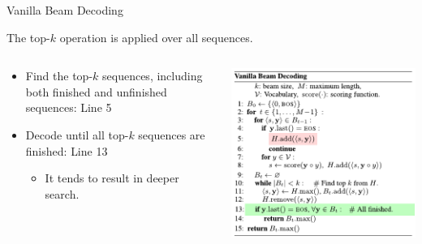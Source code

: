 \documentclass[t, unicode, 12pt, xdvipdfmx, aspectratio=169, bxjsarticle]{beamer}
\begin{document}
\begin{frame}[label={sec:org98134dc}]{Vanilla Beam Decoding}
\vspace{-0.2cm}
\begin{block}{The top-$k$ operation is applied over all sequences.}
\begin{columns}
\begin{column}{0.5\columnwidth}
\begin{itemize}
\item Find the top-\(k\) sequences, including both finished and unfinished sequences: \colorbox{red!15}{Line 5}
\item Decode until all top-\(k\) sequences are finished: \colorbox{green!25}{Line 13}
\begin{itemize}
\item It tends to result in deeper search.
\end{itemize}
\end{itemize}
\end{column}

\begin{column}{0.5\columnwidth}
\begin{center}
\includegraphics[width=0.95\linewidth]{./figure/vanilla.pdf}
\end{center}
\end{column}
\end{columns}
\end{block}
\end{frame}
\end{document}
